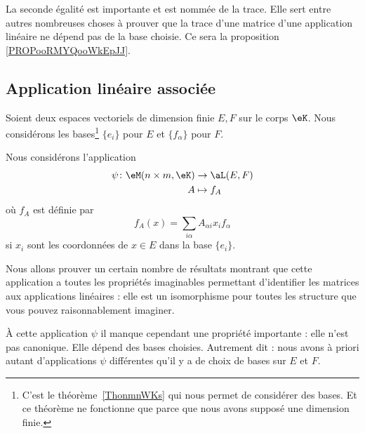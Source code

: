 \begin{normaltext}
    La seconde égalité est importante et est nommée  de la trace. Elle sert entre autres nombreuses choses à prouver que la trace d'une matrice d'une application linéaire ne dépend pas de la base choisie. Ce sera la proposition \ref{PROPooRMYQooWkEpJJ}.
\end{normaltext}

\subsection{Application linéaire associée}

Soient deux espaces vectoriels de dimension finie \( E,F\) sur le corps \( \eK\). Nous considérons les bases\footnote{C'est le théorème~\ref{ThonmnWKs} qui nous permet de considérer des bases. Et ce théorème ne fonctionne que parce que nous avons supposé une dimension finie.} \( \{ e_i \}\) pour \( E\) et \( \{ f_{\alpha} \}\) pour \( F\). 

\begin{definition}      \label{DEFooJVOAooUgGKme}
    Nous considérons l'application
    \begin{equation}        \label{EQooVZQWooMyFFeO}
        \begin{aligned}
            \psi\colon \eM(n\times m, \eK)&\to \aL(E,F) \\
            A&\mapsto f_A 
        \end{aligned}
    \end{equation}
    où \( f_A\) est définie par
    \begin{equation}
        f_A(x)=\sum_{i\alpha}A_{\alpha i}x_if_{\alpha}
    \end{equation}
    si \( x_i\) sont les coordonnées de \( x\in E\) dans la base \( \{ e_i \}\).
\end{definition}


Nous allons prouver un certain nombre de résultats montrant que cette application a toutes les propriétés imaginables permettant d'identifier les matrices aux applications linéaires : elle est un isomorphisme pour toutes les structure que vous pouvez raisonnablement imaginer.

À cette application \( \psi\) il manque cependant une propriété importante : elle n'est pas canonique. Elle dépend des bases choisies. Autrement dit : nous avons à priori autant d'applications \( \psi\) différentes qu'il y a de choix de bases sur \( E\) et \( F\). %

